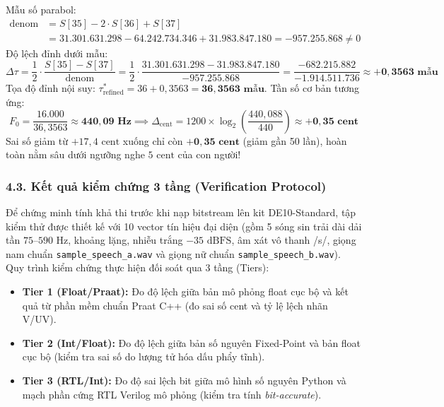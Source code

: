 \documentclass[11pt,a4paper]{article}
\begin{document}
\begin{itemize}
    Mẫu số parabol:
    \begin{align*}
    \text{denom} &= S[35] - 2 \cdot S[36] + S[37] \\
    &= 31.301.631.298 - 64.242.734.346 + 31.983.847.180 = -957.255.868 \ne 0
    \end{align*}
    Độ lệch đỉnh dưới mẫu:
    \begin{equation}
    \Delta\tau = \frac{1}{2} \cdot \frac{S[35] - S[37]}{\text{denom}} = \frac{1}{2} \cdot \frac{31.301.631.298 - 31.983.847.180}{-957.255.868} = \frac{-682.215.882}{-1.914.511.736} \approx \mathbf{+0{,}3563\text{ mẫu}}
    \end{equation}
    Tọa độ đỉnh nội suy: $\tau^*_{\text{refined}} = 36 + 0{,}3563 = \mathbf{36{,}3563\text{ mẫu}}$. Tần số cơ bản tương ứng:
    \begin{equation}
    F_0 = \frac{16.000}{36{,}3563} \approx \mathbf{440{,}09\text{ Hz}} \implies \Delta_{\text{cent}} = 1200 \times \log_2\left(\frac{440{,}088}{440}\right) \approx \mathbf{+0{,}35\text{ cent}}
    \end{equation}
    Sai số giảm từ $+17{,}4\text{ cent}$ xuống chỉ còn $\mathbf{+0{,}35\text{ cent}}$ (giảm gần 50 lần), hoàn toàn nằm sâu dưới ngưỡng nghe $5\text{ cent}$ của con người!
\end{itemize}

\subsubsection*{4.3. Kết quả kiểm chứng 3 tầng (Verification Protocol)}

Để chứng minh tính khả thi trước khi nạp bitstream lên kit DE10-Standard, tập kiểm thử được thiết kế với 10 vector tín hiệu đại diện (gồm 5 sóng sin trải dài dải tần $75\text{--}590\text{ Hz}$, khoảng lặng, nhiễu trắng $-35\text{ dBFS}$, âm xát vô thanh /s/, giọng nam chuẩn \texttt{sample\_speech\_a.wav} và giọng nữ chuẩn \texttt{sample\_speech\_b.wav}). Quy trình kiểm chứng thực hiện đối soát qua 3 tầng (Tiers):
\begin{itemize}
    \setlength{\itemsep}{0.5pt}
    \item \textbf{Tier 1 (Float/Praat):} Đo độ lệch giữa bản mô phỏng float cục bộ và kết quả từ phần mềm chuẩn Praat C++ (đo sai số cent và tỷ lệ lệch nhãn V/UV).
    \item \textbf{Tier 2 (Int/Float):} Đo độ lệch giữa bản số nguyên Fixed-Point và bản float cục bộ (kiểm tra sai số do lượng tử hóa dấu phẩy tĩnh).
    \item \textbf{Tier 3 (RTL/Int):} Đo độ sai lệch bit giữa mô hình số nguyên Python và mạch phần cứng RTL Verilog mô phỏng (kiểm tra tính \emph{bit-accurate}).
\end{itemize}
\end{document}
